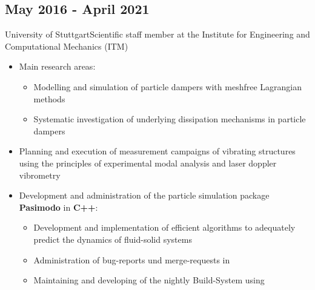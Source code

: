 \documentclass{mycv}
\begin{document}
\begin{paracol}{2}
\switchcolumn
{}%

\subsection{May 2016 - April 2021}{University of
Stuttgart}{Scientific staff member at the Institute for Engineering and
	Computational Mechanics (ITM)}
	  \begin{itemize}
			\item  Main research areas: 
				\begin{itemize}
					\item Modelling and simulation of particle dampers with
						meshfree Lagrangian methods
			    \item Systematic investigation of underlying dissipation mechanisms in
						particle dampers  
		\end{itemize}
			\item Planning and execution of measurement campaigns of
				vibrating structures using the principles of experimental modal analysis
				and laser doppler vibrometry
			\item Development and administration of the particle simulation package 
			{\bfseries \,Pasimodo} in {\bfseries C++}:
			\begin{itemize}
				\item Development and implementation of efficient algorithms to adequately
					predict the dynamics of fluid-solid systems
				\item Administration of bug-reports und merge-requests in
					\href{https://about.gitlab.com/}{}
				\item Maintaining and developing of the nightly Build-System using

\end{itemize}
\end{itemize}
\end{paracol}
\end{document}
